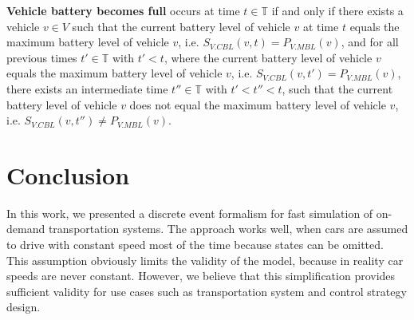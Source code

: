 \documentclass[graybox]{svmult}
\begin{document}
\vspace{2mm}
\noindent \textbf{Vehicle battery becomes full} occurs at time $t \in \mathbb{T}$ if and only if there exists a vehicle $v \in V$ such that the current battery level of vehicle $v$ at time $t$ equals the maximum battery level of vehicle $v$, i.e. $S_{V.CBL}(v,t) = P_{V.MBL}(v)$, and for all previous times $t' \in \mathbb{T}$ with $t' < t$, where the current battery level of vehicle $v$ equals the maximum battery level of vehicle $v$, i.e. $S_{V.CBL}(v,t') = P_{V.MBL}(v)$, there exists an intermediate time $t'' \in \mathbb{T}$ with $t' < t'' < t$, such that the current battery level of vehicle $v$ does not equal the maximum battery level of vehicle $v$, i.e. $S_{V.CBL}(v,t'') \neq P_{V.MBL}(v)$.

\section{Conclusion}
\label{sec:con}

In this work, we presented a discrete event formalism for fast simulation of on-demand transportation systems.
The approach works well, when cars are assumed to drive with constant speed most of the time because states can be omitted.
This assumption obviously limits the validity of the model, because in reality car speeds are never constant.
However, we believe that this simplification provides sufficient validity for use cases such as transportation system and control strategy design.



\end{document}
